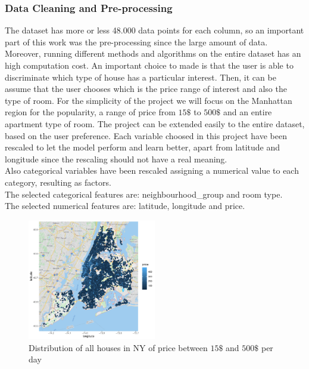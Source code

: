 \documentclass{FR16}
\begin{document}
\subsubsection{Data Cleaning and Pre-processing}
The dataset has more or less 48.000 data points for each column, so an important part of this work was the pre-processing since the large amount of data. Moreover, running different methods and algorithms on the entire dataset has an high computation cost. An important choice to made is that the user is able to discriminate which type of house has a particular interest. Then, it can be assume that the user chooses which is the price range of interest and also the type of room. For the simplicity of the project we will focus on the Manhattan region for the popularity, a range of price from $15\$$ to $500\$$ and an entire apartment type of room. The project can be extended easily to the entire dataset, based on the user preference. 
Each variable choosed in this project have been rescaled to let the model perform and learn better, apart from latitude and longitude since the rescaling should not have a real meaning.
\\ Also categorical variables have been rescaled assigning a numerical value to each category, resulting as factors. \\
The selected categorical features are: neighbourhood\_group and room type.\\
The selected numerical features are: latitude, longitude and price.
\begin{figure}[H]
\centering
\includegraphics[width=0.5\textwidth]{figures/figure3.pdf} 
\caption{\label{fig:3} Distribution of all houses in NY of price between $15\$$ and $500\$$ per day}
\end{figure}
\end{document}
